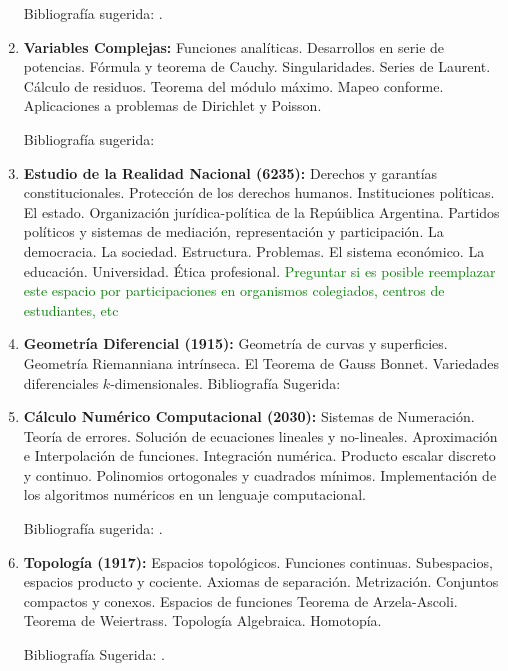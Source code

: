 \documentclass[a4paper, 12pt]{article}
\begin{document}
\begin{enumerate}
Bibliografía sugerida: \cite{roederer, sears}.


\item\textbf{Variables Complejas:}
Funciones analíticas. Desarrollos en serie de potencias. Fórmula
y teorema de Cauchy. Singularidades. Series de Laurent. Cálculo de
residuos. Teorema del módulo máximo. Mapeo conforme. Aplicaciones a problemas de Dirichlet y Poisson.

Bibliografía sugerida: \cite{ahlfors, churchill,conway}



\item\textbf{Estudio de la Realidad Nacional (6235):} Derechos y garantías constitucionales. Protección de los derechos humanos. Instituciones políticas.
El estado. Organización jurídica-política de la Repúiblica Argentina. Partidos políticos y sistemas de
mediación, representación y participación. La democracia. La sociedad. Estructura. Problemas. El
sistema económico. La educación. Universidad. Ética profesional.
\textcolor{green}{Preguntar si es posible reemplazar este espacio por participaciones en organismos colegiados, centros de estudiantes, etc}


\item\textbf{Geometría Diferencial (1915):} Geometría de curvas y superficies.
 Geometría Riemanniana
intrínseca. El Teorema de Gauss Bonnet. Variedades diferenciales $k$-dimensionales.
Bibliografía Sugerida: \cite{docarmo,morgan,oneill}




\item\textbf{Cálculo Numérico Computacional (2030):} Sistemas de Numeración.
Teoría de errores. Solución de ecuaciones lineales y no-lineales.
Aproximación e Interpolación de funciones. Integración numérica.
Producto escalar discreto y continuo. Polinomios ortogonales y
cuadrados mínimos. Implementación de los algoritmos numéricos en
un lenguaje computacional.

Bibliografía sugerida: \cite{burden, cheney}.



\item\textbf{Topología (1917):}  Espacios topológicos. Funciones continuas. Subespacios, espacios producto
y cociente. Axiomas de separación. Metrización.
Conjuntos compactos y conexos. Espacios de funciones Teorema de Arzela-Ascoli. Teorema de Weiertrass. 
 Topología Algebraica. Homotopía.

Bibliografía Sugerida: \cite{dugundji, kelley,
munkres, morris1989topology,  JohnMcCleary84,StefanWaldmann87,JohnB.Conway251, RobertAConover507}.


\end{enumerate}
\end{document}
